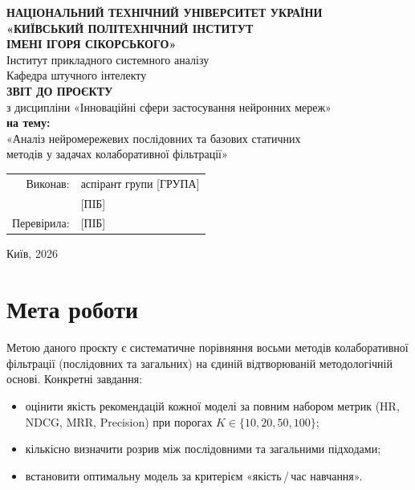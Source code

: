\documentclass[12pt,a4paper]{article}
\begin{document}
\begin{titlepage}
\begin{center}
\textbf{НАЦІОНАЛЬНИЙ ТЕХНІЧНИЙ УНІВЕРСИТЕТ УКРАЇНИ}\\[0.2cm]
\textbf{«КИЇВСЬКИЙ ПОЛІТЕХНІЧНИЙ ІНСТИТУТ}\\
\textbf{ІМЕНІ ІГОРЯ СІКОРСЬКОГО»}\\[0.5cm]
Інститут прикладного системного аналізу\\
Кафедра штучного інтелекту\\[2.5cm]

{\large\bfseries ЗВІТ ДО ПРОЄКТУ}\\[0.5cm]

{\large з дисципліни «Інноваційні сфери застосування нейронних мереж»}\\[0.8cm]

{\large\bfseries на тему:}\\[0.3cm]
{\large «Аналіз нейромережевих послідовних та базових статичних\\
методів у задачах колаборативної фільтрації»}\\[3.5cm]
\end{center}

\begin{flushright}
\begin{tabular}{rl}
Виконав:      & аспірант групи [ГРУПА] \\
              & [ПІБ] \\[1.2em]
Перевірила:   & [ПІБ] \\
\end{tabular}
\end{flushright}

\vfill
\begin{center}
Київ, 2026
\end{center}
\end{titlepage}

\section{Мета роботи}

Метою даного проєкту є систематичне порівняння восьми методів
колаборативної фільтрації (послідовних та загальних) на єдиній
відтворюваній методологічній основі.
Конкретні завдання:
\begin{itemize}
    \item оцінити якість рекомендацій кожної моделі за повним набором метрик
          (HR, NDCG, MRR, Precision) при порогах $K\!\in\!\{10,20,50,100\}$;
    \item кількісно визначити розрив між послідовними та загальними підходами;
    \item встановити оптимальну модель за критерієм «якість\,/\,час навчання».
\end{itemize}
\end{document}
